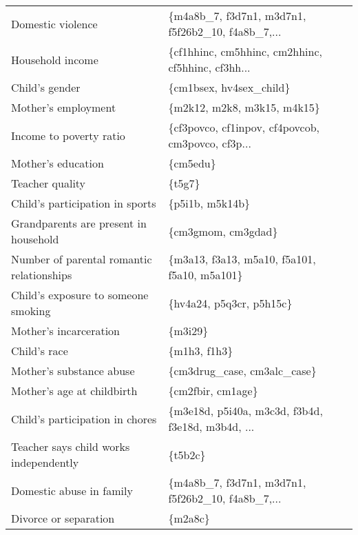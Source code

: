 \begin{tabular}{ll}
                            Domestic violence &  \{m4a8b\_7, f3d7n1, m3d7n1, f5f26b2\_10, f4a8b\_7,... \\
                             Household income &  \{cf1hhinc, cm5hhinc, cm2hhinc, cf5hhinc, cf3hh... \\
                               Child's gender &                            \{cm1bsex, hv4sex\_child\} \\
                          Mother's employment &                        \{m2k12, m2k8, m3k15, m4k15\} \\
                      Income to poverty ratio &  \{cf3povco, cf1inpov, cf4povcob, cm3povco, cf3p... \\
                           Mother's education &                                           \{cm5edu\} \\
                              Teacher quality &                                             \{t5g7\} \\
              Child's participation in sports &                                    \{p5i1b, m5k14b\} \\
        Grandparents are present in household &                                 \{cm3gmom, cm3gdad\} \\
    Number of parental romantic relationships &       \{m3a13, f3a13, m5a10, f5a101, f5a10, m5a101\} \\
          Child's exposure to someone smoking &                           \{hv4a24, p5q3cr, p5h15c\} \\
                       Mother's incarceration &                                            \{m3i29\} \\
                                 Child's race &                                       \{m1h3, f1h3\} \\
                     Mother's substance abuse &                        \{cm3drug\_case, cm3alc\_case\} \\
                   Mother's age at childbirth &                                  \{cm2fbir, cm1age\} \\
              Child's participation in chores &  \{m3e18d, p5i40a, m3c3d, f3b4d, f3e18d, m3b4d, ... \\
       Teacher says child works independently &                                            \{t5b2c\} \\
                     Domestic abuse in family &  \{m4a8b\_7, f3d7n1, m3d7n1, f5f26b2\_10, f4a8b\_7,... \\
                        Divorce or separation &                                            \{m2a8c\} \\

\end{tabular}
